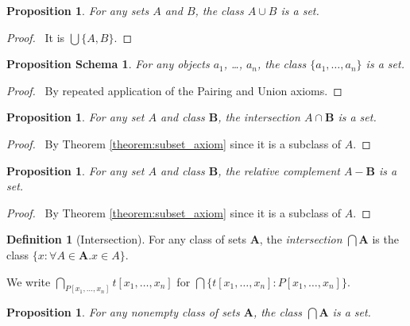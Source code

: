 \documentclass{report}
\let\qed\relax
\newtheorem{proposition}[axiom]{Proposition}
\newtheorem{props}[axiom]{Proposition Schema}
\theoremstyle{definition}
\newtheorem{definition}[axiom]{Definition}
\begin{document}
    \begin{proposition}
        For any sets $A$ and $B$, the class $A \cup B$ is a set.
    \end{proposition}

    \begin{proof}
        \pf\ It is $\bigcup \{ A, B \}$. \qed
    \end{proof}

    \begin{props}
        For any objects $a_1$, \ldots, $a_n$, the class $\{ a_1, \ldots, a_n \}$ is a set.
    \end{props}

    \begin{proof}
        \pf\ By repeated application of the Pairing and Union axioms. \qed
    \end{proof}

    \begin{proposition}
        For any set $A$ and class $\mathbf{B}$, the intersection $A \cap \mathbf{B}$ is a set.
    \end{proposition}

    \begin{proof}
        \pf\ By Theorem \ref{theorem:subset_axiom} since it is a subclass of $A$. \qed
    \end{proof}

    \begin{proposition}
        For any set $A$ and class $\mathbf{B}$, the relative complement $A - \mathbf{B}$ is a set.
    \end{proposition}

    \begin{proof}
        \pf\ By Theorem \ref{theorem:subset_axiom} since it is a subclass of $A$. \qed
    \end{proof}
    
    \begin{definition}[Intersection]
        For any class of sets $\mathbf{A}$, the \emph{intersection} $\bigcap \mathbf{A}$ is the class
        $\{ x : \forall A \in \mathbf{A}. x \in A \}$.

        We write $\bigcap_{P[x_1, \ldots, x_n]} t[x_1, \ldots, x_n]$ for $\bigcap \{ t[x_1, \ldots, x_n]
        : P[x_1, \ldots, x_n] \}$.
    \end{definition}

    \begin{proposition}
        For any nonempty class of sets $\mathbf{A}$, the class $\bigcap \mathbf{A}$ is a set.
    \end{proposition}
\end{document}
